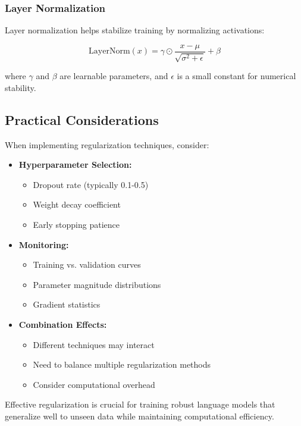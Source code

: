 \subsubsection{Layer Normalization}
\noindent
Layer normalization helps stabilize training by normalizing activations:

\begin{equation}
\text{LayerNorm}(x) = \gamma \odot \frac{x - \mu}{\sqrt{\sigma^2 + \epsilon}} + \beta
\end{equation}

where $\gamma$ and $\beta$ are learnable parameters, and $\epsilon$ is a small constant for numerical stability.

\subsection{Practical Considerations}

\noindent
When implementing regularization techniques, consider:
\begin{itemize}
    \item \textbf{Hyperparameter Selection:}
    \begin{itemize}
        \item Dropout rate (typically 0.1-0.5)
        \item Weight decay coefficient
        \item Early stopping patience
    \end{itemize}
    
    \item \textbf{Monitoring:}
    \begin{itemize}
        \item Training vs. validation curves
        \item Parameter magnitude distributions
        \item Gradient statistics
    \end{itemize}
    
    \item \textbf{Combination Effects:}
    \begin{itemize}
        \item Different techniques may interact
        \item Need to balance multiple regularization methods
        \item Consider computational overhead
    \end{itemize}
\end{itemize}

\noindent
Effective regularization is crucial for training robust language models that generalize well to unseen data while maintaining computational efficiency.

